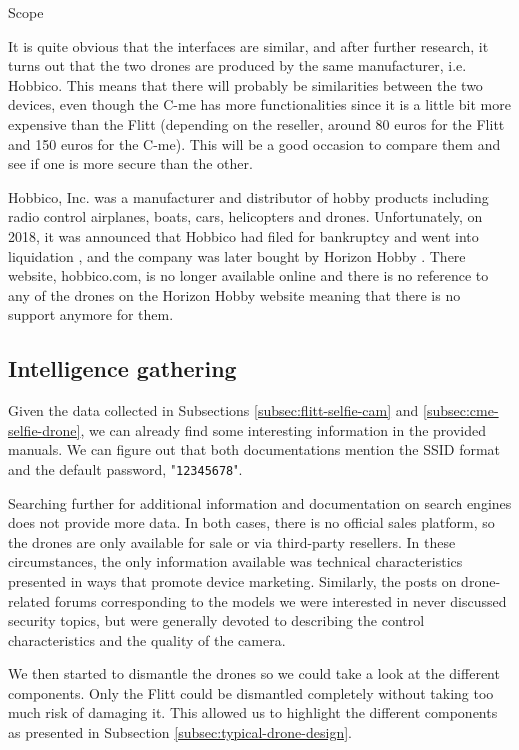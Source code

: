 \begin{chaptercover}{Scope}
\begin{tip}
It is quite obvious that the interfaces are similar, and after further research, it turns out that the two drones are produced by the same manufacturer, i.e. Hobbico. This means that there will probably be similarities between the two devices, even though the C-me has more functionalities since it is a little bit more expensive than the Flitt (depending on the reseller, around 80 euros  for the Flitt and 150 euros for the C-me). This will be a good occasion to compare them and see if one is more secure than the other.
\end{tip}

\begin{info}
Hobbico, Inc. was a manufacturer and distributor of hobby products including radio control airplanes, boats, cars, helicopters and drones. Unfortunately, on 2018, it was announced that Hobbico had filed for bankruptcy and went into liquidation \cite{hobbico-liquidation}, and the company was later bought by Horizon Hobby \cite{horizon-hobby}. There website, hobbico.com, is no longer available online and there is no reference to any of the drones on the Horizon Hobby website meaning that there is no support anymore for them.
\end{info}

\subsection{Intelligence gathering}

Given the data collected in Subsections \ref{subsec:flitt-selfie-cam} and \ref{subsec:cme-selfie-drone}, we can already find some interesting information in the provided manuals. We can figure out that both documentations mention the SSID format and the default password, "\texttt{12345678}".

Searching further for additional information and documentation on search engines does not provide more data. In both cases, there is no official sales platform, so the drones are only available for sale or via third-party resellers. In these circumstances, the only information available was technical characteristics presented in ways that promote device marketing. Similarly, the posts on drone-related forums corresponding to the models we were interested in never discussed security topics, but were generally devoted to describing the control characteristics and the quality of the camera.

We then started to dismantle the drones so we could take a look at the different components. Only the Flitt could be dismantled completely without taking too much risk of damaging it. This allowed us to highlight the different components as presented in Subsection \ref{subsec:typical-drone-design}.


\end{chaptercover}
